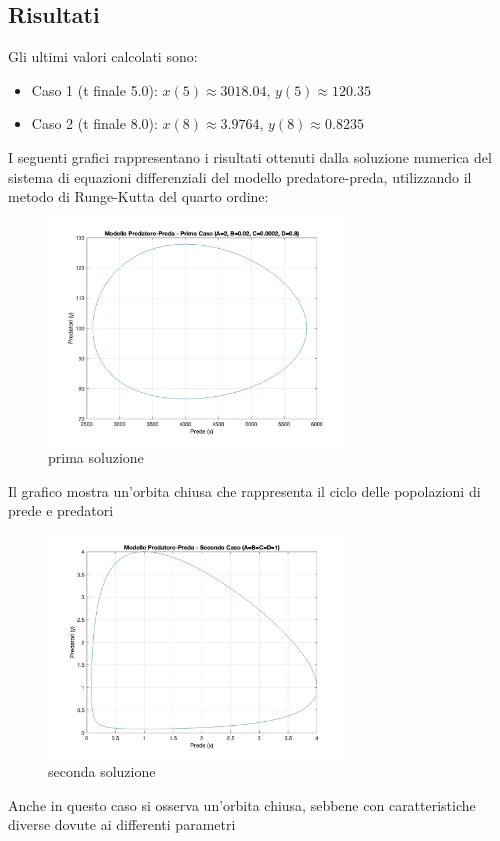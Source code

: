 \documentclass[11pt]{article}
\begin{document}
\subsection{Risultati}
Gli ultimi valori calcolati sono:
\begin{itemize}
	\item Caso 1 (t finale 5.0): $x(5)\approx3018.04$, $y(5)\approx120.35$
	\item Caso 2 (t finale 8.0): $x(8)\approx3.9764$, $y(8)\approx0.8235$
\end{itemize}
I seguenti grafici rappresentano i risultati ottenuti dalla soluzione numerica del sistema di equazioni differenziali del modello predatore-preda, utilizzando il metodo di Runge-Kutta del quarto ordine:
\begin{figure}[H]
  \centering
  \includegraphics[width=0.7\textwidth]{images/Es4/fig1.jpg} 
  \caption{prima soluzione}
  \label{fig:funzione}
\end{figure}
Il grafico mostra un'orbita chiusa che rappresenta il ciclo delle popolazioni di prede e predatori
\begin{figure}[H]
  \centering
  \includegraphics[width=0.7\textwidth]{images/Es4/fig2.jpg} 
  \caption{seconda soluzione}
  \label{fig:funzione}
\end{figure}
Anche in questo caso si osserva un'orbita chiusa, sebbene con caratteristiche diverse dovute ai differenti parametri
\end{document}
